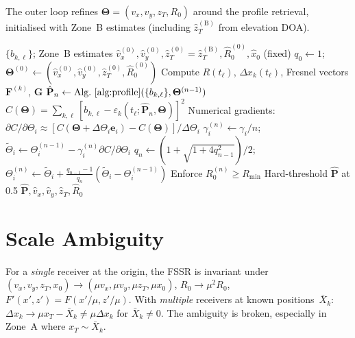 \documentclass[11pt,a4paper]{article}
\begin{document}
The outer loop refines $\bm{\Theta}=(v_x,v_y,z_T,R_0)$ around the
profile retrieval, initialised with Zone~B estimates (including
$\hat{z}_T^{(\mathrm{B})}$ from elevation DOA).

\begin{algorithm}[H]
\caption{Joint shadow profile and parameter estimation}
\label{alg:joint}
\begin{algorithmic}[1]
\Require $\{b_{k,\ell}\}$; Zone~B estimates
$\hat{v}_x^{(0)},\hat{v}_y^{(0)},
\hat{z}_T^{(0)}{=}\hat{z}_T^{(\mathrm{B})},
\hat{R}_0^{(0)},\hat{x}_0$ (fixed)
\State $q_0\leftarrow 1$;\;
$\bm{\Theta}^{(0)}\leftarrow
(\hat{v}_x^{(0)},\hat{v}_y^{(0)},\hat{z}_T^{(0)},\hat{R}_0^{(0)})$
  \State Compute $R(t_\ell)$, $\Delta x_k(t_\ell)$, Fresnel vectors
    $\mathbf{F}^{(k)}$, $\mathbf{G}$
  \State $\hat{\mathbf{P}}_n\leftarrow
    \text{Alg.~\ref{alg:profile}}
    (\{b_{k,\ell}\},\bm{\Theta}^{(n-1)})$
  \State $C(\bm{\Theta})
    =\sum_{k,\ell}[b_{k,\ell}
    -\varepsilon_k(t_\ell;\hat{\mathbf{P}}_n,\bm{\Theta})]^2$
  \State Numerical gradients:
    $\partial C/\partial\Theta_i\approx
    [C(\bm{\Theta}{+}\Delta\Theta_i\mathbf{e}_i)
    {-}C(\bm{\Theta})]/\Delta\Theta_i$
  \State $\gamma_i^{(n)}\leftarrow\gamma_i/n$;\;
    $\tilde{\Theta}_i\leftarrow\Theta_i^{(n-1)}
    -\gamma_i^{(n)}\partial C/\partial\Theta_i$
  \State $q_n\leftarrow(1{+}\sqrt{1{+}4q_{n-1}^2})/2$;\;
    $\Theta_i^{(n)}\leftarrow\tilde{\Theta}_i
    +\tfrac{q_{n-1}{-}1}{q_n}
    (\tilde{\Theta}_i{-}\Theta_i^{(n-1)})$
  \State Enforce $R_0^{(n)}\ge R_{\min}$
\EndFor
\State Hard-threshold $\hat{\mathbf{P}}$ at 0.5
\State \Return
  $\hat{\mathbf{P}},\hat{v}_x,\hat{v}_y,\hat{z}_T,\hat{R}_0$
\end{algorithmic}
\end{algorithm}

\section{Scale Ambiguity}
\label{sec:ambiguity}

For a \emph{single} receiver at the origin, the FSSR is invariant
under $(v_x,v_y,z_T,x_0)\to(\mu v_x,\mu v_y,\mu z_T,\mu x_0)$,
$R_0\to\mu^2R_0$, $F'(x',z')=F(x'/\mu,z'/\mu)$.  With
\emph{multiple} receivers at known positions~$\bar{X}_k$:
$\Delta x_k\to\mu x_T-\bar{X}_k\ne\mu\Delta x_k$ for
$\bar{X}_k\ne 0$.  The ambiguity is broken, especially in Zone~A
where $x_T\sim\bar{X}_k$.
\end{document}
